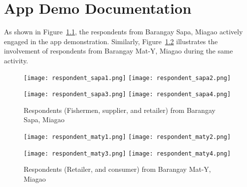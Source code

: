 %
%
%                 

\chapter{App Demo Documentation}
\label{sec:appendixd}


As shown in Figure~\ref{fig:sapa}, the respondents from Barangay Sapa, Miagao actively engaged in the app demonstration. Similarly, Figure~\ref{fig:mat-y} illustrates the involvement of respondents from Barangay Mat-Y, Miagao during the same activity.


\begin{figure}[h!]
  \centering
  \texttt{[image: respondent\_sapa1.png]}
  \hfill
  \texttt{[image: respondent\_sapa2.png]}
  \par\bigskip
  \texttt{[image: respondent\_sapa3.png]}
  \hfill
  \texttt{[image: respondent\_sapa4.png]}
  \caption{Respondents (Fishermen, supplier, and retailer) from Barangay Sapa, Miagao}
  \label{fig:sapa}
\end{figure}

\begin{figure}[h!]
  \centering
  \texttt{[image: respondent\_maty1.png]}
  \hfill
  \texttt{[image: respondent\_maty2.png]}
  \par\bigskip
  \texttt{[image: respondent\_maty3.png]}
  \hfill
  \texttt{[image: respondent\_maty4.png]}
  \caption{Respondents (Retailer, and consumer) from Barangay Mat-Y, Miagao}
  \label{fig:mat-y}
\end{figure}
